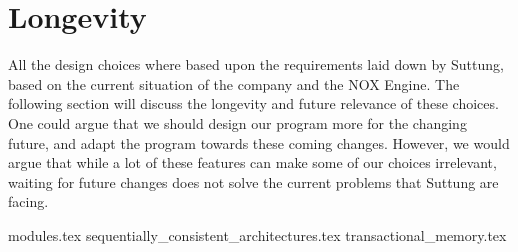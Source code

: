 \section{Longevity}
All the design choices where based upon the requirements laid down by Suttung,
based on the current situation of the company and the NOX Engine.
The following section will discuss the longevity and future relevance of
these choices.
One could argue that we should design our program more for the changing future,
and adapt the program towards these coming changes.
However, we would argue that while a lot of these features can make some of our choices
irrelevant, waiting for future changes does not solve the current problems that
Suttung are facing.

{modules.tex}
{sequentially_consistent_architectures.tex}
{transactional_memory.tex}
